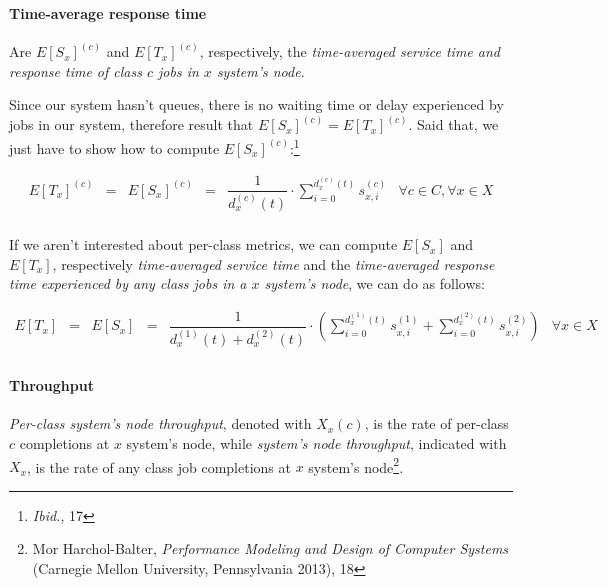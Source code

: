 \documentclass[10pt,a4paper]{article}
\begin{document}
\paragraph{Time-average response time}

Are $E[S_x]^{(c)}$ and $E[T_x]^{(c)}$, respectively, the \textit{time-averaged service time and response time of class $c$ jobs in $x$ system's node}. 

Since our system hasn't queues, there is no waiting time or delay experienced by jobs in our system, therefore result that $E[S_x]^{(c)} = E[T_x]^{(c)}$.
Said that, we just have to show how to compute $E[S_x]^{(c)}$:\footnote{\textit{Ibid.}, 17}

\begin{equation}
\begin{array} {rccccr} 
E[T_x]^{(c)} & = & E[S_x]^{(c)} & = & \displaystyle \dfrac{1}{d_x^{(c)}(t)} \cdot \sum_{i = 0}^{d_x^{(c)}(t)} s_{x,i}^{(c)} & \forall c \in C, \forall x \in X \\
\end{array}
\end{equation}

If we aren't interested about per-class metrics, we can compute $E[S_x]$ and $E[T_x]$, respectively \textit{time-averaged service time} and the \textit{time-averaged response time experienced by any class jobs in a $x$ system's node}, we can do as follows:

\begin{equation}
\begin{array} {rccccr} 
E[T_x] & = & E[S_x] & = & \displaystyle \dfrac{1}{d_x^{(1)}(t) + d_x^{(2)}(t)} \cdot \left( \sum_{i = 0}^{d_x^{(1)}(t)} s_{x,i}^{(1)} + \sum_{i = 0}^{d_x^{(2)}(t)} s_{x,i}^{(2)} \right) & \forall x \in X \\
\end{array}
\end{equation}

\paragraph{Throughput}

\textit{Per-class system's node throughput}, denoted with $X_x(c)$, is the rate of per-class $c$ completions at $x$ system's node, while \textit{system's node throughput}, indicated with $X_x$, is the rate of any class job completions at $x$ system's node\footnote{Mor Harchol-Balter, \textit{Performance Modeling and Design of Computer Systems} (Carnegie Mellon University, Pennsylvania 2013), 18}. 
\end{document}
